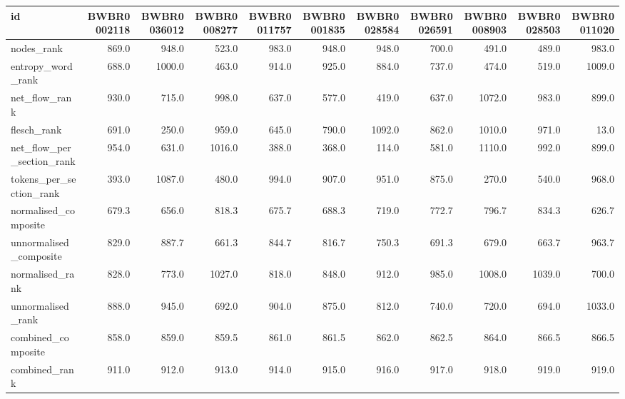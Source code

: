 \begin{tabular}{lrrrrrrrrrr}
\toprule
id & BWBR0002118 & BWBR0036012 & BWBR0008277 & BWBR0011757 & BWBR0001835 & BWBR0028584 & BWBR0026591 & BWBR0008903 & BWBR0028503 & BWBR0011020 \\
\midrule
nodes\_rank & 869.0 & 948.0 & 523.0 & 983.0 & 948.0 & 948.0 & 700.0 & 491.0 & 489.0 & 983.0 \\
\cline{1-11}
entropy\_word\_rank & 688.0 & 1000.0 & 463.0 & 914.0 & 925.0 & 884.0 & 737.0 & 474.0 & 519.0 & 1009.0 \\
\cline{1-11}
net\_flow\_rank & 930.0 & 715.0 & 998.0 & 637.0 & 577.0 & 419.0 & 637.0 & 1072.0 & 983.0 & 899.0 \\
\cline{1-11}
flesch\_rank & 691.0 & 250.0 & 959.0 & 645.0 & 790.0 & 1092.0 & 862.0 & 1010.0 & 971.0 & 13.0 \\
\cline{1-11}
net\_flow\_per\_section\_rank & 954.0 & 631.0 & 1016.0 & 388.0 & 368.0 & 114.0 & 581.0 & 1110.0 & 992.0 & 899.0 \\
\cline{1-11}
tokens\_per\_section\_rank & 393.0 & 1087.0 & 480.0 & 994.0 & 907.0 & 951.0 & 875.0 & 270.0 & 540.0 & 968.0 \\
\cline{1-11}
normalised\_composite & 679.3 & 656.0 & 818.3 & 675.7 & 688.3 & 719.0 & 772.7 & 796.7 & 834.3 & 626.7 \\
\cline{1-11}
unnormalised\_composite & 829.0 & 887.7 & 661.3 & 844.7 & 816.7 & 750.3 & 691.3 & 679.0 & 663.7 & 963.7 \\
\cline{1-11}
normalised\_rank & 828.0 & 773.0 & 1027.0 & 818.0 & 848.0 & 912.0 & 985.0 & 1008.0 & 1039.0 & 700.0 \\
\cline{1-11}
unnormalised\_rank & 888.0 & 945.0 & 692.0 & 904.0 & 875.0 & 812.0 & 740.0 & 720.0 & 694.0 & 1033.0 \\
\cline{1-11}
combined\_composite & 858.0 & 859.0 & 859.5 & 861.0 & 861.5 & 862.0 & 862.5 & 864.0 & 866.5 & 866.5 \\
\cline{1-11}
combined\_rank & 911.0 & 912.0 & 913.0 & 914.0 & 915.0 & 916.0 & 917.0 & 918.0 & 919.0 & 919.0 \\
\cline{1-11}
\bottomrule
\end{tabular}
